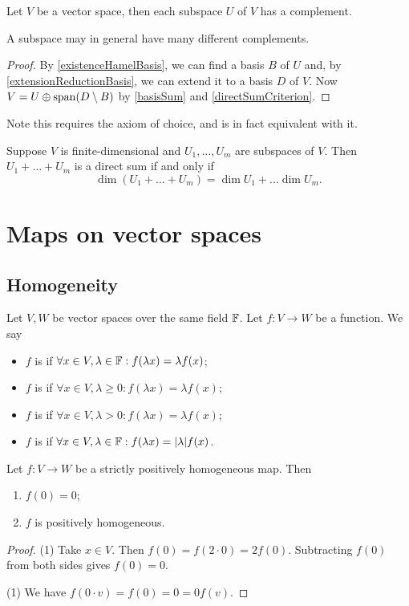 \begin{proposition}
Let $V$ be a vector space, then each subspace $U$ of $V$ has a complement.
\end{proposition}
A subspace may in general have many different complements.
\begin{proof}
By \ref{existenceHamelBasis}, we can find a basis $B$ of $U$ and, by \ref{extensionReductionBasis}, we can extend it to a basis $D$ of $V$. Now $V = U \oplus \operatorname{span}(D\setminus B)$ by \ref{basisSum} and \ref{directSumCriterion}.
\end{proof}
Note this requires the axiom of choice, and is in fact equivalent with it.
\begin{corollary}
Suppose $V$ is finite-dimensional and $U_1,\ldots, U_m$ are subspaces of $V$. Then $U_1+\ldots+ U_m$ is a direct sum \textup{if and only if}
\[ \dim(U_1+\ldots+U_m) = \dim U_1 + \ldots \dim U_m. \]
\end{corollary}


\section{Maps on vector spaces}
\subsection{Homogeneity}
\begin{definition}
Let $V, W$ be vector spaces over the same field $\mathbb{F}$. Let $f: V\to W$ be a function. We say
\begin{itemize}
\item $f$ is  if $\forall x\in V,\lambda\in \mathbb{F}: f(\lambda x) = \lambda f(x)$;
\item $f$ is  if $\forall x\in V,\lambda\geq 0: f(\lambda x) = \lambda f(x)$;
\item $f$ is  if $\forall x\in V,\lambda > 0: f(\lambda x) = \lambda f(x)$;
\item $f$ is  if $\forall x\in V,\lambda\in\mathbb{F}: f(\lambda x) = |\lambda| f(x)$.
\end{itemize}
\end{definition}

\begin{lemma} \label{homogeneousFunctionLemma}
Let $f: V\to W$ be a strictly positively homogeneous map. Then
\begin{enumerate}
\item $f(0) = 0$;
\item $f$ is positively homogeneous.
\end{enumerate}
\end{lemma}
\begin{proof}
(1) Take $x\in V$. Then $f(0) = f(2\cdot 0) = 2f(0)$. Subtracting $f(0)$ from both sides gives $f(0) = 0$.

(1) We have $f(0\cdot v) = f(0) = 0 = 0f(v)$.
\end{proof}


